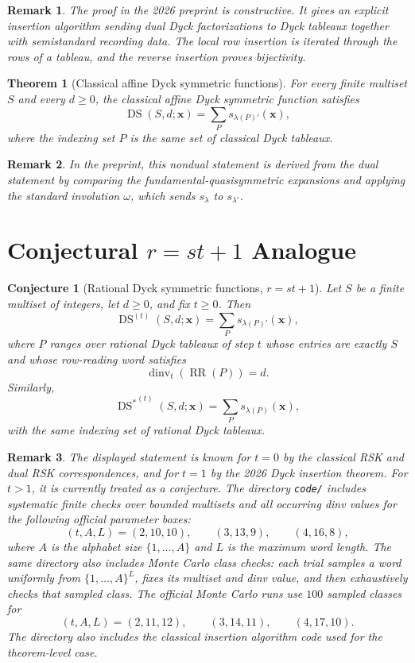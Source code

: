 \documentclass{article}
\newcommand{\dinv}{\operatorname{dinv}}
\newcommand{\DS}{\operatorname{DS}}
\newcommand{\DSstar}{\operatorname{DS}^{\ast}}
\newtheorem{theorem}{Theorem}
\newtheorem{conjecture}{Conjecture}
\newtheorem{remark}{Remark}
\begin{document}
\begin{remark}
The proof in the 2026 preprint is constructive.  It gives an explicit
insertion algorithm sending dual Dyck factorizations to Dyck tableaux together
with semistandard recording data.  The local row insertion is iterated through
the rows of a tableau, and the reverse insertion proves bijectivity.
\end{remark}

\begin{theorem}[Classical affine Dyck symmetric functions]
For every finite multiset \(S\) and every \(d\ge0\), the classical affine Dyck
symmetric function satisfies
\[
  \DS(S,d;\mathbf x)
  =
  \sum_P s_{\lambda(P)'}(\mathbf x),
\]
where the indexing set \(P\) is the same set of classical Dyck tableaux.
\end{theorem}

\begin{remark}
In the preprint, this nondual statement is derived from the dual statement by
comparing the fundamental-quasisymmetric expansions and applying the standard
involution \(\omega\), which sends \(s_\lambda\) to \(s_{\lambda'}\).
\end{remark}

\section{Conjectural \(r=s t+1\) Analogue}

\begin{conjecture}[Rational Dyck symmetric functions, \(r=s t+1\)]
Let \(S\) be a finite multiset of integers, let \(d\ge0\), and fix \(t\ge0\).
Then
\[
  \DS^{(t)}(S,d;\mathbf x)
  =
  \sum_P s_{\lambda(P)'}(\mathbf x),
\]
where \(P\) ranges over rational Dyck tableaux of step \(t\) whose entries
are exactly \(S\) and whose row-reading word satisfies
\[
  \dinv_t(\operatorname{RR}(P))=d.
\]
Similarly,
\[
  {\DSstar}^{(t)}(S,d;\mathbf x)
  =
  \sum_P s_{\lambda(P)}(\mathbf x),
\]
with the same indexing set of rational Dyck tableaux.
\end{conjecture}

\begin{remark}
The displayed statement is known for \(t=0\) by the classical RSK and dual
RSK correspondences, and for \(t=1\) by the 2026 Dyck insertion theorem.  For
\(t>1\), it is currently treated as a conjecture.  The directory
\texttt{code/} includes systematic finite checks over bounded multisets and
all occurring dinv values for the following official parameter boxes:
\[
  (t,A,L)=(2,10,10),\qquad (3,13,9),\qquad (4,16,8),
\]
where \(A\) is the alphabet size \(\{1,\ldots,A\}\) and \(L\) is the maximum
word length.  The same directory also includes Monte Carlo class checks: each
trial samples a word uniformly from \(\{1,\ldots,A\}^L\), fixes its multiset
and dinv value, and then exhaustively checks that sampled class.  The official
Monte Carlo runs use \(100\) sampled classes for
\[
  (t,A,L)=(2,11,12),\qquad (3,14,11),\qquad (4,17,10).
\]
The directory also includes the classical insertion algorithm code used for
the theorem-level case.
\end{remark}
\end{document}
